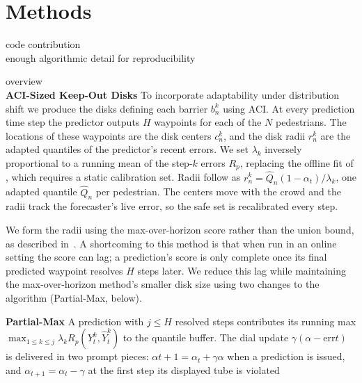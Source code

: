 \documentclass[letterpaper]{article} %
\begin{document}
\section{Methods}
code contribution\\
enough algorithmic detail for reproducibility

overview\\


\textbf{ACI-Sized Keep-Out Disks}
To incorporate adaptability under distribution shift we produce the disks defining each barrier \(b^k_n\) using ACI. At every prediction time step the predictor outputs \(H\) waypoints for each of the \(N\) pedestrians. The locations of these waypoints are the disk centers \(c^k_n\), and the disk radii \(r^k_n\) are the adapted quantiles of the predictor's recent errors. We set $\lambda_k$ inversely proportional to a running mean of the step-$k$ errors $R_p$, replacing the offline fit of \citeauthor{cleaveland_conformal_2024}, which requires a static calibration set. Radii follow as $r^k_n = \hat Q_n(1-\alpha_t)/\lambda_k$, one adapted quantile $\hat Q_n$ per pedestrian. The centers move with the crowd and the radii track the forecaster's live error, so the safe set is recalibrated every step.

We form the radii using the max-over-horizon score rather than the union bound, as described in~\cite{cleaveland_conformal_2024}. A shortcoming to this method is that when run in an online setting the score can lag; a prediction's score is only complete once its final predicted waypoint resolves \(H\) steps later. We reduce this lag while maintaining the max-over-horizon method's smaller disk size using two changes to the algorithm (Partial-Max, below).



\textbf{Partial-Max} A prediction with \(j \le H\) resolved steps contributes its running max \(\max_{1\le k\le j}\lambda_k R_p(Y^k_t,\hat Y^k_t)\) to the quantile buffer. The dial update \(\gamma(\alpha-\mathrm{err}t)\) is delivered in two prompt pieces: \(\alpha{t+1} = \alpha_t + \gamma\alpha\) when a prediction is issued, and \(\alpha_{t+1} = \alpha_t - \gamma\) at the first step its displayed tube is violated
\end{document}
